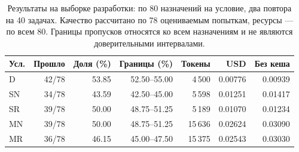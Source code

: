 \begin{table}[htbp]\centering\small
\caption{Результаты на выборке разработки: по 80 назначений на условие, два повтора на 40 задачах. Качество рассчитано по 78 оцениваемым попыткам, ресурсы --- по всем 80. Границы пропусков относятся ко всем назначениям и не являются доверительными интервалами.}\label{tab:dev40-main}
\begin{tabular}{lrrrrrr}\toprule
Усл. & Прошло & Доля (\%) & Границы (\%) & Токены & USD & Без кеша\\
\midrule
D & 42/78 & 53.85 & 52.50--55.00 & 4\,500 & 0.00776 & 0.00939\\
SN & 34/78 & 43.59 & 42.50--45.00 & 5\,598 & 0.01251 & 0.01417\\
SR & 39/78 & 50.00 & 48.75--51.25 & 5\,189 & 0.01070 & 0.01234\\
MN & 39/78 & 50.00 & 48.75--51.25 & 15\,636 & 0.02624 & 0.03090\\
MR & 36/78 & 46.15 & 45.00--47.50 & 15\,375 & 0.02543 & 0.03030\\
\bottomrule\end{tabular}\end{table}
